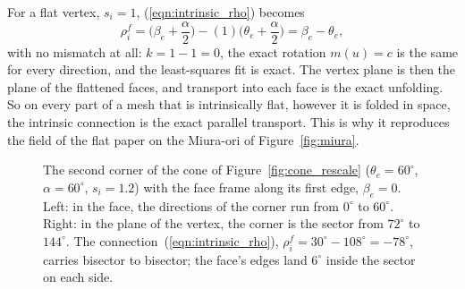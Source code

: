For a flat vertex, $s_i = 1$, (\ref{eqn:intrinsic_rho}) becomes
\begin{equation*}
\rho_i^f = \Big(\beta_e + \frac\alpha2\Big) - (1)\Big(\theta_e + \frac\alpha2\Big) = \beta_e - \theta_e ,
\end{equation*}
with no mismatch at all: $k = 1 - 1 = 0$, the exact rotation $m(u) = c$ is the same for every direction, and the least-squares fit is exact. The vertex plane is then the plane of the flattened faces, and transport into each face is the exact unfolding. So on every part of a mesh that is intrinsically flat, however it is folded in space, the intrinsic connection is the exact parallel transport. This is why it reproduces the field of the flat paper on the Miura-ori of Figure~\ref{fig:miura}.
\begin{figure}[t]
\centering
{}
\caption{The second corner of the cone of Figure~\ref{fig:cone_rescale} ($\theta_e = 60^\circ$, $\alpha = 60^\circ$, $s_i = 1.2$) with the face frame along its first edge, $\beta_e = 0$. Left: in the face, the directions of the corner run from $0^\circ$ to $60^\circ$. Right: in the plane of the vertex, the corner is the sector from $72^\circ$ to $144^\circ$. The connection~(\ref{eqn:intrinsic_rho}), $\rho_i^f = 30^\circ - 108^\circ = -78^\circ$, carries bisector to bisector; the face's edges land $6^\circ$ inside the sector on each side.}
\label{fig:corner_map}
\end{figure}

